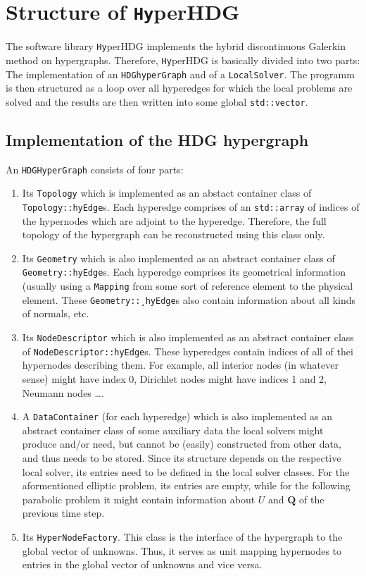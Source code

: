 \documentclass[a4paper, english, 12pt, reqno, draft]{amsart}
\theoremstyle{definition}
\theoremstyle{remark}
\numberwithin{equation}{section}
\newcommand{\hyperHDG}{{\fontfamily{pzc}\selectfont \texttt{Hy}\hspace{-1.5pt}perHDG }}
\renewcommand{\vec}[1]{\ensuremath{\boldsymbol{#1}}}
\newcommand{\code}[1]{\texttt{#1}}
\begin{document}
\section{Structure of \hyperHDG}
% 
The software library \hyperHDG implements the hybrid discontinuous Galerkin method on hypergraphs. Therefore, \hyperHDG is basically divided into two parts: The implementation of an \code{HDGhyperGraph} and of a \code{LocalSolver}. The programm is then structured as a loop over all hyperedges for which the local problems are solved and the results are then written into some global \code{std::vector}.
% 
\subsection{Implementation of the HDG hypergraph}
% 
An \code{HDG\-Hyper\-Graph} consists of four parts:
% 
\begin{enumerate}
 \item Its \code{Topology} which is implemented as an abstact container class of \code{Topology::hyEdge}s. Each hyperedge comprises of an \code{std::array} of indices of the hypernodes which are adjoint to the hyperedge. Therefore, the full topology of the hypergraph can be reconstructed using this class only.
 \item Its \code{Geometry} which is also implemented as an abstract container class of \code{Geometry::hyEdge}s. Each hyperedge comprises its geometrical information (usually using a \code{Mapping} from some sort of reference element to the physical element. These \code{Geometry::\-¸hyEdge}s also contain information about all kinds of normals, etc.
 \item Its \code{NodeDescriptor} which is also implemented as an abstract container class of \code{NodeDescriptor::hyEdge}s. These hyperedges contain indices of all of thei hypernodes describing them. For example, all interior nodes (in whatever sense) might have index 0, Dirichlet nodes might have indices 1 and 2, Neumann nodes \ldots.
 \item A \code{DataContainer} (for each hyperedge) which is also implemented as an abstract container class of some auxiliary data the local solvers might produce and/or need, but cannot be (easily) constructed from other data, and thus needs to be stored. Since its structure depends on the respective local solver, its entries need to be defined in the local solver classes. For the aformentioned elliptic problem, its entries are empty, while for the following parabolic problem it might contain information about $U$ and $\vec Q$ of the previous time step.
 \item Its \code{HyperNodeFactory}. This class is the interface of the hypergraph to the global vector of unknowns. Thus, it serves as unit mapping hypernodes to entries in the global vector of unknowns and vice versa.
\end{enumerate}
\end{document}
